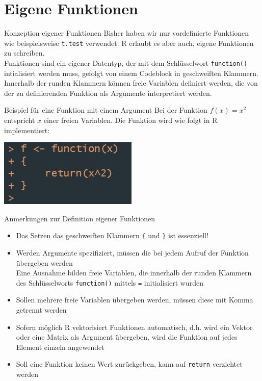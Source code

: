 \documentclass[xcolor=dvipsnames, aspectratio = 169]{beamer}
\begin{document}
\section{Eigene Funktionen}

\begin{frame}[fragile]{Konzeption eigener Funktionen}
    Bisher haben wir nur vordefinierte Funktionen wie beispielsweise \verb+t.test+ verwendet. \textsf R erlaubt es aber auch, eigene Funktionen zu schreiben.\bigskip\\
    Funktionen sind ein eigener Datentyp, der mit dem Schlüsselwort \verb+function()+ intialisiert werden muss, gefolgt von einem Codeblock in geschweiften Klammern. Innerhalb der runden Klammern können freie Variablen definiert werden, die von der zu definierenden Funktion als Argumente interpretiert werden. 
\end{frame}

\begin{frame}[fragile]{Beispiel für eine Funktion mit einem Argument}
  Bei der Funktion $f(x) = x^2$ entspricht $x$ einer freien Variablen. Die Funktion wird wie folgt in \textsf R implementiert:\bigskip\\
  \begin{centering}
    \includegraphics[]{func1.png}
  \end{centering}
\end{frame}

\begin{frame}[fragile]{Anmerkungen zur Definition eigener Funktionen}
  \begin{itemize}
    \item Das Setzen das geschweiften Klammern \verb+{+ und \verb+}+ ist essenziell!
    \item Werden Argumente spezifiziert, müssen die bei jedem Aufruf der Funktion übergeben werden\\Eine Ausnahme bilden freie Variablen, die innerhalb der runden Klammern des Schlüsselworts \verb+function()+ mittels \verb+=+ initialisiert wurden
    \item Sollen mehrere freie Variablen übergeben werden, müssen diese mit Komma getrennt werden 
    \item Sofern möglich \textsf R vektorisiert Funktionen automatisch, d.h. wird ein Vektor oder eine Matrix als Argument übergeben, wird die Funktion auf jedes Element einzeln angewendet
    \item Soll eine Funktion keinen Wert zurückgeben, kann auf \verb+return+ verzichtet werden
  \end{itemize}
\end{frame}
\end{document}
